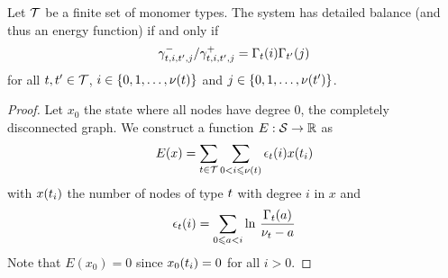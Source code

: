 \begin{proposition}
  Let $\mathcal{T}$ be a finite set of monomer types.
  The system has detailed balance
  (and thus an energy function)
  if and only if
  \begin{equation}
    \label{eq:cas-db}
    \gamma^-_{t,i,t',j} / \gamma^+_{t,i,t',j} =
    \Gamma_t(i) \Gamma_{t'}(j)
  \end{equation}
  for all $t,t' \in \mathcal{T}$,
  $i \in \left\{ 0,1,\ldots,\nu(t) \right\}$ and
  $j \in \left\{ 0,1,\ldots,\nu(t') \right\}$.
\end{proposition}
\begin{proof}
  Let $x_0$ the state where all nodes have degree $0$,
  \ie the completely disconnected graph.
  We construct a function $E: \mathcal{S} \to \mathbb{R}$ as
  \[ E(x) = \sum_{t \in \mathcal{T}} \sum_{0 < i \leqslant \nu(t)}
            \epsilon_t(i) x(t_i) \]
  with $x(t_i)$ the number of nodes of type $t$
  with degree $i$ in $x$ and
  \[ \epsilon_t(i) = \sum_{0 \leqslant a < i}
     \ln\, \frac{\Gamma_t(a)}{\nu_t - a} \]
  Note that $E(x_0) = 0$ since $x_0(t_i) = 0$ for all $i > 0$.


\end{proof}

